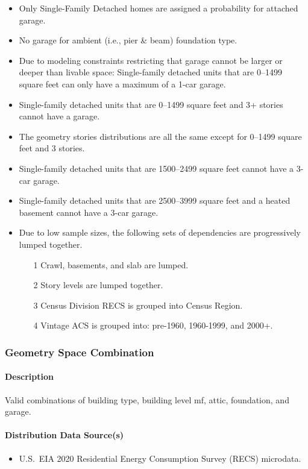 \begin{itemize}
    \item Only Single-Family Detached homes are assigned a probability for attached garage.
    \item No garage for ambient (i.e., pier \& beam) foundation type.
    \item Due to modeling constraints restricting that garage cannot be larger or deeper than livable space: Single-family detached units that are 0--1499 square feet can only have a maximum of a 1-car garage.
    \item Single-family detached units that are 0--1499 square feet and 3+ stories cannot have a garage.
    \item The geometry stories distributions are all the same except for 0--1499 square feet and 3 stories.
    \item Single-family detached units that are 1500--2499 square feet cannot have a 3-car garage.
    \item Single-family detached units that are 2500--3999 square feet and a heated basement cannot have a 3-car garage. 
    \item Due to low sample sizes, the following sets of dependencies are progressively lumped together. 
    \begin{itemize}
    \item [1] Crawl, basements, and slab are lumped.
    \item [2] Story levels are lumped together.
    \item [3] Census Division RECS is grouped into Census Region.
    \item [4] Vintage ACS is grouped into: pre-1960, 1960-1999, and 2000+.
    \end{itemize}
\end{itemize}

\subsubsection{Geometry Space Combination}
\paragraph{Description}
Valid combinations of building type, building level mf, attic, foundation, and garage.

\paragraph{Distribution Data Source(s)}
\begin{itemize}
    \item U.S.~EIA 2020 Residential Energy Consumption Survey (RECS) microdata.
\end{itemize}

